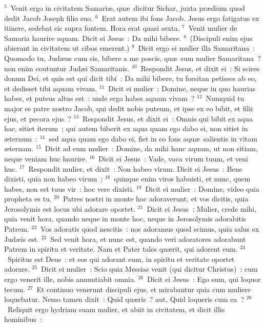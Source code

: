 ${}^{5}$~Venit ergo in civitatem Samari\ae , qu\ae\ dicitur Sichar, juxta pr\ae dium quod dedit Jacob Joseph filio suo.
${}^{6}$~Erat autem ibi fons Jacob. Jesus ergo fatigatus ex itinere, sedebat sic supra fontem. Hora erat quasi sexta.
${}^{7}$~Venit mulier de Samaria haurire aquam. Dicit ei Jesus~: Da mihi bibere.
${}^{8}$~(Discipuli enim ejus abierant in civitatem ut cibos emerent.)
${}^{9}$~Dicit ergo ei mulier illa Samaritana~: Quomodo tu, Jud\ae us cum sis, bibere a me poscis, qu\ae\ sum mulier Samaritana~? non enim coutuntur Jud\ae i Samaritanis.
${}^{10}$~Respondit Jesus, et dixit ei~: Si scires donum Dei, et quis est qui dicit tibi~: Da mihi bibere, tu forsitan petisses ab eo, et dedisset tibi aquam vivam.
${}^{11}$~Dicit ei mulier~: Domine, neque in quo haurias habes, et puteus altus est~: unde ergo habes aquam vivam~?
${}^{12}$~Numquid tu major es patre nostro Jacob, qui dedit nobis puteum, et ipse ex eo bibit, et filii ejus, et pecora ejus~?
${}^{13}$~Respondit Jesus, et dixit ei~: Omnis qui bibit ex aqua hac, sitiet iterum~; qui autem biberit ex aqua quam ego dabo ei, non sitiet in \ae ternum~:
${}^{14}$~sed aqua quam ego dabo ei, fiet in eo fons aqu\ae\ salientis in vitam \ae ternam.
${}^{15}$~Dicit ad eum mulier~: Domine, da mihi hanc aquam, ut non sitiam, neque veniam huc haurire.
${}^{16}$~Dicit ei Jesus~: Vade, voca virum tuum, et veni huc.
${}^{17}$~Respondit mulier, et dixit~: Non habeo virum. Dicit ei Jesus~: Bene dixisti, quia non habeo virum~;
${}^{18}$~quinque enim viros habuisti, et nunc, quem habes, non est tuus vir~: hoc vere dixisti.
${}^{19}$~Dicit ei mulier~: Domine, video quia propheta es tu.
${}^{20}$~Patres nostri in monte hoc adoraverunt, et vos dicitis, quia Jerosolymis est locus ubi adorare oportet.
${}^{21}$~Dicit ei Jesus~: Mulier, crede mihi, quia venit hora, quando neque in monte hoc, neque in Jerosolymis adorabitis Patrem.
${}^{22}$~Vos adoratis quod nescitis~: nos adoramus quod scimus, quia salus ex Jud\ae is est.
${}^{23}$~Sed venit hora, et nunc est, quando veri adoratores adorabunt Patrem in spiritu et veritate. Nam et Pater tales qu\ae rit, qui adorent eum.
${}^{24}$~Spiritus est Deus~: et eos qui adorant eum, in spiritu et veritate oportet adorare.
${}^{25}$~Dicit ei mulier~: Scio quia Messias venit (qui dicitur Christus)~: cum ergo venerit ille, nobis annuntiabit omnia.
${}^{26}$~Dicit ei Jesus~: Ego sum, qui loquor tecum.
${}^{27}$~Et continuo venerunt discipuli ejus, et mirabantur quia cum muliere loquebatur. Nemo tamen dixit~: Quid qu\ae ris~? aut, Quid loqueris cum ea~?
${}^{28}$~Reliquit ergo hydriam suam mulier, et abiit in civitatem, et dicit illis hominibus~:

